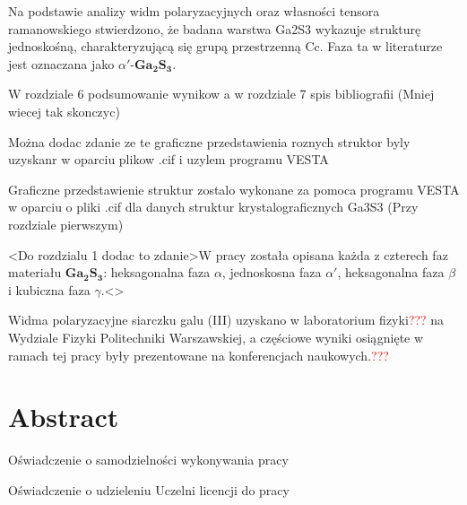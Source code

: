 Na podstawie analizy widm polaryzacyjnych oraz własności tensora ramanowskiego stwierdzono, że badana warstwa Ga2S3 wykazuje strukturę jednoskośną, charakteryzującą się grupą przestrzenną Cc. Faza ta w literaturze jest oznaczana jako $\alpha'$-$\mathbf{Ga_{2}S_{3}}$.

W rozdziale 6 podsumowanie wynikow a w rozdziale 7 spis bibliografii (Mniej wiecej tak skonczyc)

Można dodac zdanie ze te graficzne przedstawienia roznych struktor byly uzyskanr w oparciu plikow .cif i uzylem programu VESTA

Graficzne przedstawienie struktur zostalo wykonane za pomoca programu VESTA w oparciu o pliki .cif dla danych struktur krystalograficznych Ga3S3 (Przy rozdziale pierwszym)

<Do rozdzialu 1 dodac to zdanie>W pracy została opisana każda z czterech faz materiału $\mathbf{Ga_{2}S_{3}}$: heksagonalna faza $\alpha$, jednoskosna faza $\alpha'$, heksagonalna faza $\beta$ i kubiczna faza $\gamma$.<> 

Widma polaryzacyjne siarczku galu (III) uzyskano w laboratorium fizyki\textcolor{red}{???} na Wydziale Fizyki Politechniki Warszawskiej, a częściowe wyniki osiągnięte w ramach tej pracy były prezentowane na konferencjach naukowych.\textcolor{red}{???} 

\newpage

\section*{Abstract}

\newpage

Oświadczenie o samodzielności wykonywania pracy

\newpage

Oświadczenie o udzieleniu Uczelni licencji do pracy

\newpage